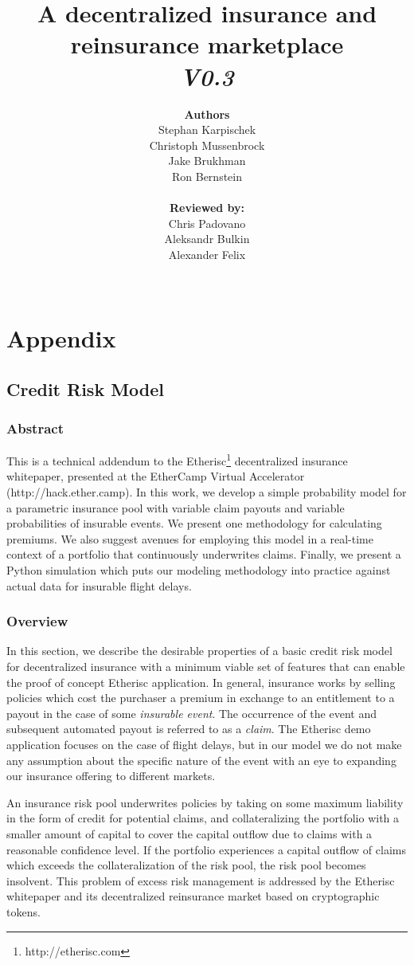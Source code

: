 \documentclass[12pt,a4paper]{article}
\title{A decentralized insurance and reinsurance marketplace\\\vspace{5mm}\small\textit{V0.3}\vspace{20mm}}
\author{\textbf{Authors}\\Stephan Karpischek\\Christoph Mussenbrock\\Jake Brukhman\\Ron Bernstein\\\\\textbf{Reviewed by:}\\Chris Padovano\\Aleksandr Bulkin\\Alexander Felix\\\\}
\begin{document}
\setcounter{page}{43}

\appendix
\renewcommand{\thesection}{\arabic{section}}
\setcounter{section}{7}
\section{Appendix}
\setcounter{subsection}{1}
\newpage
\subsection{Credit Risk Model}

\subsubsection{Abstract}

This is a technical addendum to the Etherisc\footnote{http://etherisc.com} decentralized insurance whitepaper, presented at the EtherCamp Virtual Accelerator (http://hack.ether.camp). In this work, we develop a simple probability model for a parametric insurance pool with variable claim payouts and variable probabilities of insurable events. We present one methodology for calculating premiums. We also suggest avenues for employing this model in a real-time context of a portfolio that continuously underwrites claims. Finally, we present a Python simulation which puts our modeling methodology into practice against actual data for insurable flight delays.

\subsubsection{Overview}

In this section, we describe the desirable properties of a basic credit risk model for decentralized insurance with a minimum viable set of features that can enable the proof of concept Etherisc application. In general, insurance works by selling policies which cost the purchaser a premium in exchange to an entitlement to a payout in the case of some \textit{insurable event}. The occurrence of the event and subsequent automated payout is referred to as a \textit{claim}. The Etherisc demo application focuses on the case of flight delays, but in our model we do not make any assumption about the specific nature of the event with an eye to expanding our insurance offering to different markets.

An insurance risk pool underwrites policies by taking on some maximum liability in the form of credit for potential claims, and collateralizing the portfolio with a smaller amount of capital to cover the capital outflow due to claims with a reasonable confidence level. If the portfolio experiences a capital outflow of claims which exceeds the collateralization of the risk pool, the risk pool becomes insolvent. This problem of excess risk management is addressed by the Etherisc whitepaper and its decentralized reinsurance market based on cryptographic tokens.
\end{document}
